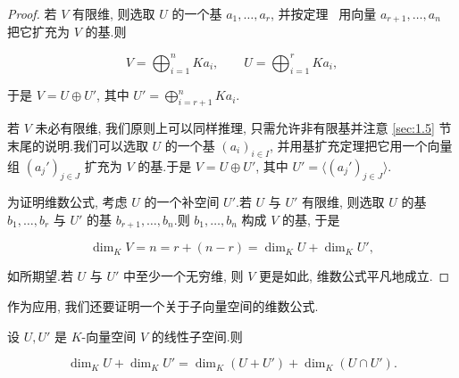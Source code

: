 \begin{proof}
若 $V$ 有限维, 则选取 $U$ 的一个基 $a_1, \ldots, a_r$, 并按定理~ 用向量 $a_{r + 1}, \ldots, a_n$ 把它扩充为 $V$ 的基.则

\[
V = \bigoplus_{i = 1}^{n} Ka_i, \qquad U = \bigoplus_{i = 1}^{r} Ka_i,
\]

于是 $V = U \oplus U'$, 其中 $U' = \bigoplus_{i = r + 1}^{n} Ka_i$.

若 $V$ 未必有限维, 我们原则上可以同样推理, 只需允许非有限基并注意 \ref{sec:1.5} 节末尾的说明.我们可以选取 $U$ 的一个基 $(a_i)_{i \in I}$, 并用基扩充定理把它用一个向量组 $(a_j')_{j \in J}$ 扩充为 $V$ 的基.于是 $V = U \oplus U'$, 其中 $U' = \langle (a_j')_{j \in J} \rangle$.

为证明维数公式, 考虑 $U$ 的一个补空间 $U'$.若 $U$ 与 $U'$ 有限维, 则选取 $U$ 的基 $b_1, \ldots, b_r$ 与 $U'$ 的基 $b_{r + 1}, \ldots, b_n$.则 $b_1, \ldots, b_n$ 构成 $V$ 的基, 于是

\[
\dim_K V = n = r + (n - r) = \dim_K U + \dim_K U',
\]

如所期望.若 $U$ 与 $U'$ 中至少一个无穷维, 则 $V$ 更是如此, 维数公式平凡地成立.
\end{proof}

作为应用, 我们还要证明一个关于子向量空间的维数公式.

\begin{theorem}[维数公式]\label{thm:1.6.5}
设 $U, U'$ 是 $K$-向量空间 $V$ 的线性子空间.则

\[
\dim_K U + \dim_K U' = \dim_K (U + U') + \dim_K (U \cap U')\text{.}
\]
\end{theorem}

